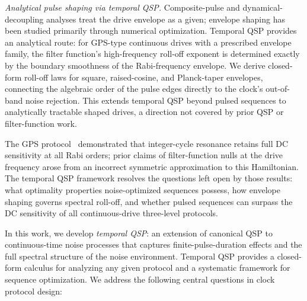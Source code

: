 \documentclass[aps,pra,twocolumn,superscriptaddress,longbibliography]{revtex4-2}
\begin{document}
\textit{Analytical pulse shaping via temporal QSP.}
Composite-pulse and dynamical-decoupling analyses treat the drive envelope as a given;
envelope shaping has been studied primarily through numerical optimization.
Temporal QSP provides an analytical route: for GPS-type continuous drives with a
prescribed envelope family, the filter function's high-frequency roll-off exponent is
determined exactly by the boundary smoothness of the Rabi-frequency envelope.
We derive closed-form roll-off laws for square, raised-cosine, and Planck-taper
envelopes, connecting the algebraic order of the pulse edges directly to the clock's
out-of-band noise rejection.
This extends temporal QSP beyond pulsed sequences to analytically tractable shaped drives,
a direction not covered by prior QSP or filter-function work.

The GPS protocol~\cite{GPS} demonstrated that integer-cycle
resonance retains full DC sensitivity at all Rabi orders; prior claims of
filter-function nulls at the drive frequency arose from an incorrect symmetric
approximation to this Hamiltonian.
The temporal QSP framework resolves the questions left open by those results: what
optimality properties noise-optimized sequences possess, how envelope shaping governs
spectral roll-off, and whether pulsed sequences can surpass the DC sensitivity of all
continuous-drive three-level protocols.

In this work, we develop \emph{temporal QSP}: an extension of canonical QSP to
continuous-time noise processes that captures finite-pulse-duration effects and the
full spectral structure of the noise environment.
Temporal QSP provides a closed-form calculus for analyzing any given protocol and
a systematic framework for sequence optimization.
We address the following central questions in clock protocol design:
\end{document}
